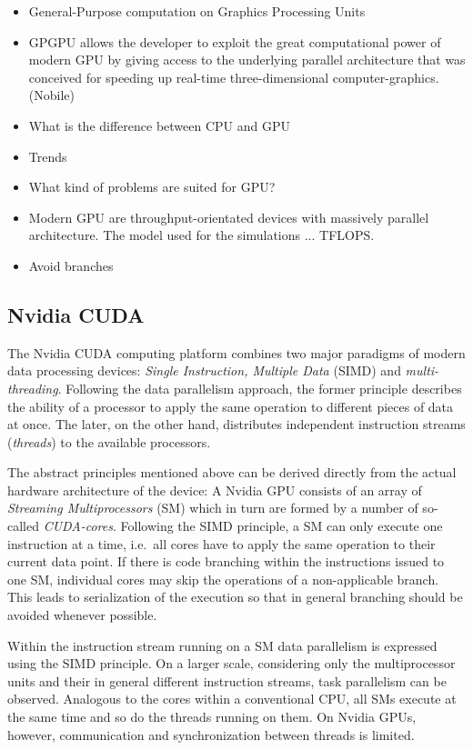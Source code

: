 \ifdebug
\begin{itemize}
\item General-Purpose computation on Graphics Processing Units
\item GPGPU allows the developer to exploit the great computational power of modern GPU by giving access to the underlying parallel architecture that was conceived for speeding up real-time three-dimensional computer-graphics. (Nobile)
\item What is the difference between CPU and GPU
\item Trends
\item What kind of problems are suited for GPU?
\item Modern GPU are throughput-orientated devices with massively parallel architecture. The model used for the simulations ... TFLOPS. 
\item Avoid branches
\end{itemize}
\fi

\subsection{Nvidia CUDA} \label{ch:cuda}
The Nvidia CUDA computing platform combines two major paradigms of modern data processing devices: \textit{Single Instruction, Multiple Data} (SIMD) and \textit{multi-threading}. Following the data parallelism approach, the former principle describes the ability of a processor to apply the same operation to different pieces of data at once. The later, on the other hand, distributes independent instruction streams (\textit{threads}) to the available processors. 

The abstract principles mentioned above can be derived directly from the actual hardware architecture of the device: A Nvidia GPU consists of an array of \textit{Streaming Multiprocessors} (SM) which in turn are formed by a number of so-called \textit{CUDA-cores}. Following the SIMD principle, a SM can only execute one instruction at a time, i.e.\ all cores have to apply the same operation to their current data point. If there is code branching within the instructions issued to one SM, individual cores may skip the operations of a non-applicable branch. This leads to serialization of the execution so that in general branching should be avoided whenever possible. 

Within the instruction stream running on a SM data parallelism is expressed using the SIMD principle. On a larger scale, considering only the multiprocessor units and their in general different instruction streams, task parallelism can be observed. Analogous to the cores within a conventional CPU, all SMs execute at the same time and so do the threads running on them. On Nvidia GPUs, however, communication and synchronization between threads is limited. 

